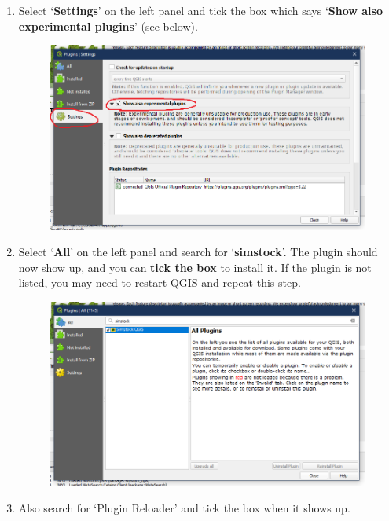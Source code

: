 \documentclass{article}
\begin{document}
\begin{enumerate}
    \item Select `\textbf{Settings}' on the left panel and tick the box which says `\textbf{Show also experimental plugins}' (see below).
    \begin{figure}[h!]
        \centering
        \includegraphics[width=14cm]{show_experimental.png}
        \label{fig:show_exp}
    \end{figure}
    
    \item Select `\textbf{All}' on the left panel and search for `\textbf{simstock}'. The plugin should now show up, and you can \textbf{tick the box} to install it. If the plugin is not listed, you may need to restart QGIS and repeat this step.
    \begin{figure}[h!]
        \centering
        \includegraphics[width=14cm]{tick-simstock.png}
        \label{fig:tick_simstock}
    \end{figure}
    
    \item Also search for `Plugin Reloader' and tick the box when it shows up.
    

\end{enumerate}
\end{document}
